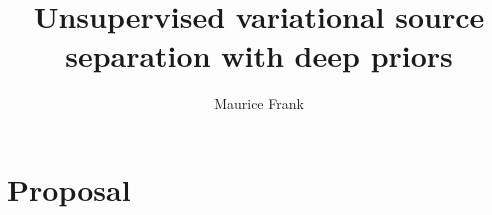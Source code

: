 \documentclass[nofonts, nobib, notitlepage, notoc]{tufte-book}
\title{Unsupervised variational source separation with deep priors}
\author{Maurice Frank}
\begin{document}
\frontmatter%
\maketitle%

\tableofcontents%
\clearpage

\mainmatter%
\chapter{Proposal}






\backmatter%

\printbibliography%
\end{document}
